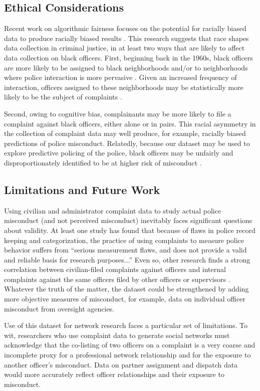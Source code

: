 \subsection{Ethical Considerations}
Recent work on algorithmic fairness focuses on the potential for racially
biased data to produce racially biased results
\cite{veale2018fairness,sloane2019ai,d2020fairness}.  This research suggests
that race shapes data collection in criminal justice, in at least two ways that
are likely to affect data collection on black officers. First, beginning back
in the 1960s, black officers are more likely to be assigned to black
neighborhoods and/or to neighborhoods where police interaction is more
pervasive \cite{Kuykendall80}. Given an increased frequency of interaction,
officers assigned to these neighborhoods may be statistically more likely to be
the subject of complaints \cite{Kane06}. 

Second, owing to cognitive bias, complainants may be more likely to file a
complaint against black officers, either alone or in pairs. This racial
asymmetry in the collection of complaint data may well produce, for example,
racially biased predictions of police misconduct. Relatedly, because our
dataset may be used to explore predictive policing of the police, black
officers may be unfairly and disproportionately identified to be at higher risk
of misconduct \cite{veale2018fairness,sloane2019ai,d2020fairness,Wood19}. 

\subsection{Limitations and Future Work}
Using civilian and administrator complaint data to study actual police
misconduct (and not perceived misconduct) inevitably faces significant
questions about validity. At least one study has found that because of flaws in
police record keeping and categorization, the practice of using complaints to
measure police behavior suffers from ``serious measurement flaws, and does not
provide a valid and reliable basis for research purposes...'' \cite{Hickman16} Even so, other
research finds a strong correlation between civilian-filed complaints against
officers and internal complaints against the same officers filed by other
officers or supervisors \cite{Lersch00}. Whatever the truth of the matter, the dataset could be
strengthened by adding more objective measures of misconduct, for example, data
on individual officer misconduct from oversight agencies.

Use of this dataset for network research faces a particular set of limitations.
To wit, researchers who use complaint data to generate social networks must
acknowledge that the co-listing of two officers on a complaint is a very coarse
and incomplete proxy for a professional network relationship and for the
exposure to another officer’s misconduct. Data on partner assignment and
dispatch data would more accurately reflect officer relationships and their
exposure to misconduct. 

